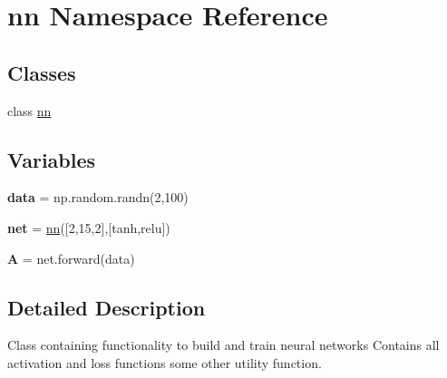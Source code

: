 \hypertarget{namespacenn}{}\section{nn Namespace Reference}
\label{namespacenn}
\subsection*{Classes}
\begin{DoxyCompactItemize}
\item 
class \hyperlink{classnn_1_1nn}{nn}
\end{DoxyCompactItemize}
\subsection*{Variables}
\begin{DoxyCompactItemize}
\item 
\mbox{\label{namespacenn_a8cd10b45c12d6c9ca2fb8e374cdc060a}} 
{\bfseries data} = np.\+random.\+randn(2,100)
\item 
\mbox{\label{namespacenn_a54c8268b552b178cca001fb57c46c027}} 
{\bfseries net} = \hyperlink{classnn_1_1nn}{nn}(\mbox{[}2,15,2\mbox{]},\mbox{[}\textquotesingle{}tanh\textquotesingle{},\textquotesingle{}relu\textquotesingle{}\mbox{]})
\item 
\mbox{\label{namespacenn_a2743a5ccb08758a725dcd3af0d6354cf}} 
{\bfseries A} = net.\+forward(data)
\end{DoxyCompactItemize}


\subsection{Detailed Description}
\begin{DoxyVerb}Class containing functionality to build and train neural networks
Contains all activation and loss functions some other utility function.
\end{DoxyVerb}
 